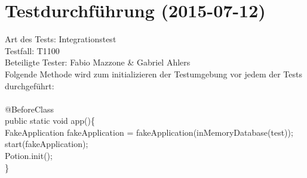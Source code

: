 \chapter{Testdurchführung (2015-07-12)}

Art des Tests: Integrationstest\\
Testfall: T1100\\
Beteiligte Tester: Fabio Mazzone \& Gabriel Ahlers\\

Folgende Methode wird zum initializieren der Testumgebung vor jedem der Tests durchgeführt:\\\\
\hspace*{0mm}@BeforeClass \\
\hspace*{0mm}public static void app()\{ \\
\hspace*{3mm}FakeApplication fakeApplication = fakeApplication(inMemoryDatabase(\grqq test\grqq)); \\
\hspace*{3mm}start(fakeApplication); \\
\hspace*{3mm}Potion.init(); \\
\hspace*{0mm}\} \\\\

